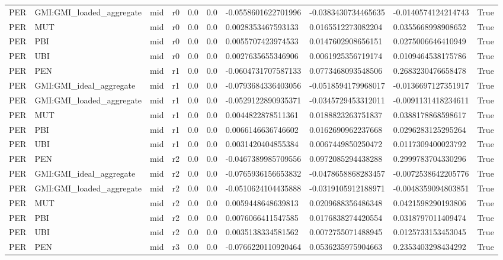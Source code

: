 \begin{table}[!htbp]
\begin{tabular}{llllllllll}
PER & GMI:GMI\_loaded\_aggregate & mid & r0 & 0.0 & 0.0 & -0.0558601622701996 & -0.0383430734465635 & -0.0140574124214743 & True \\
PER & MUT & mid & r0 & 0.0 & 0.0 & 0.0028353467593133 & 0.0165512273082204 & 0.0355668998908652 & True \\
PER & PBI & mid & r0 & 0.0 & 0.0 & 0.0055707423974533 & 0.0147602908656151 & 0.0275006646410949 & True \\
PER & UBI & mid & r0 & 0.0 & 0.0 & 0.0027635655346906 & 0.0061925356719174 & 0.0109464538175786 & True \\
PER & PEN & mid & r1 & 0.0 & 0.0 & -0.0604731707587133 & 0.0773468093548506 & 0.2683230476658478 & True \\
PER & GMI:GMI\_ideal\_aggregate & mid & r1 & 0.0 & 0.0 & -0.0793684336403056 & -0.0518594179968017 & -0.0136697127351917 & True \\
PER & GMI:GMI\_loaded\_aggregate & mid & r1 & 0.0 & 0.0 & -0.0529122890935371 & -0.0345729453312011 & -0.0091131418234611 & True \\
PER & MUT & mid & r1 & 0.0 & 0.0 & 0.0044822878511361 & 0.0188823263751837 & 0.0388178868598617 & True \\
PER & PBI & mid & r1 & 0.0 & 0.0 & 0.0066146636746602 & 0.0162690962237668 & 0.0296283125295264 & True \\
PER & UBI & mid & r1 & 0.0 & 0.0 & 0.0031420404855384 & 0.0067449850250472 & 0.0117309400023792 & True \\
PER & PEN & mid & r2 & 0.0 & 0.0 & -0.0467389985709556 & 0.0972085294438288 & 0.2999783704330296 & True \\
PER & GMI:GMI\_ideal\_aggregate & mid & r2 & 0.0 & 0.0 & -0.0765936156653832 & -0.0478658868283457 & -0.0072538642205776 & True \\
PER & GMI:GMI\_loaded\_aggregate & mid & r2 & 0.0 & 0.0 & -0.0510624104435888 & -0.0319105912188971 & -0.0048359094803851 & True \\
PER & MUT & mid & r2 & 0.0 & 0.0 & 0.0059448648639813 & 0.0209688356486348 & 0.0421598290193806 & True \\
PER & PBI & mid & r2 & 0.0 & 0.0 & 0.0076066411547585 & 0.0176838274420554 & 0.0318797011409474 & True \\
PER & UBI & mid & r2 & 0.0 & 0.0 & 0.0035138334581562 & 0.0072755071488945 & 0.0125733153453045 & True \\
PER & PEN & mid & r3 & 0.0 & 0.0 & -0.0766220110920464 & 0.0536235975904663 & 0.2353403298434292 & True \\

\end{tabular}
\end{table}
